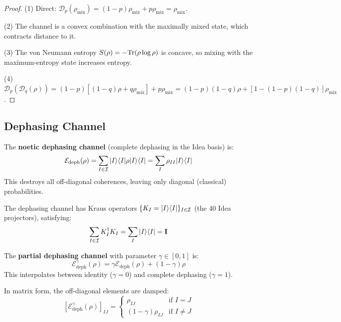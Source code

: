\begin{proof}
(1) Direct: $\mathcal{D}_p(\rho_{\mathrm{mix}}) = (1-p)\rho_{\mathrm{mix}} + p \rho_{\mathrm{mix}} = \rho_{\mathrm{mix}}$.

(2) The channel is a convex combination with the maximally mixed state, which contracts distance to it.

(3) The von Neumann entropy $S(\rho) = -\mathrm{Tr}(\rho \log \rho)$ is concave, so mixing with the maximum-entropy state increases entropy.

(4) $\mathcal{D}_p(\mathcal{D}_q(\rho)) = (1-p)[(1-q)\rho + q\rho_{\mathrm{mix}}] + p\rho_{\mathrm{mix}} = (1-p)(1-q)\rho + [1-(1-p)(1-q)]\rho_{\mathrm{mix}}$.
\end{proof}

\subsection{Dephasing Channel}

\begin{definition}
\label{def:dephasing-channel}
The \textbf{noetic dephasing channel} (complete dephasing in the Idea basis) is:
\[
\mathcal{E}_{\mathrm{deph}}(\rho) = \sum_{I \in \mathcal{I}} |I\rangle\langle I| \rho |I\rangle\langle I| = \sum_{I} \rho_{II} |I\rangle\langle I|
\]
This destroys all off-diagonal coherences, leaving only diagonal (classical) probabilities.
\end{definition}

\begin{proposition}
\label{prop:dephasing-kraus}
The dephasing channel has Kraus operators $\{K_I = |I\rangle\langle I|\}_{I \in \mathcal{I}}$ (the 40 Idea projectors), satisfying:
\[
\sum_{I \in \mathcal{I}} K_I^\dagger K_I = \sum_I |I\rangle\langle I| = \mathbf{I}
\]
\end{proposition}

\begin{definition}
\label{def:partial-dephasing}
The \textbf{partial dephasing channel} with parameter $\gamma \in [0,1]$ is:
\[
\mathcal{E}_{\mathrm{deph}}^\gamma(\rho) = \gamma \mathcal{E}_{\mathrm{deph}}(\rho) + (1-\gamma) \rho
\]
This interpolates between identity ($\gamma = 0$) and complete dephasing ($\gamma = 1$).

In matrix form, the off-diagonal elements are damped:
\[
[\mathcal{E}_{\mathrm{deph}}^\gamma(\rho)]_{IJ} = \begin{cases}
\rho_{IJ} & \text{if } I = J \\
(1-\gamma) \rho_{IJ} & \text{if } I \neq J
\end{cases}
\]
\end{definition}

